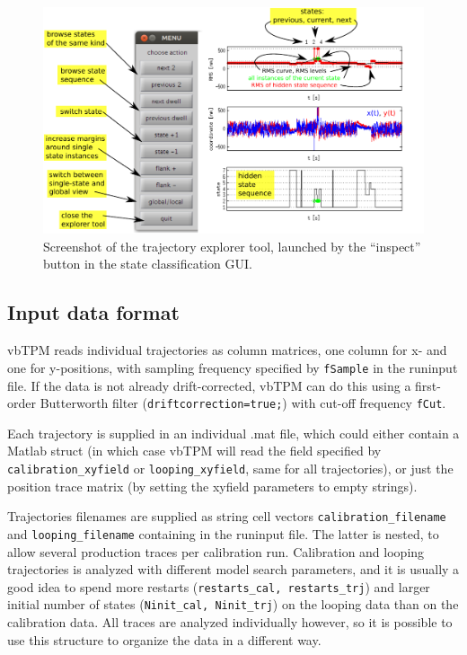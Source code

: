 \begin{figure}
  \begin{center}
    \includegraphics{figures/trajectory_explorer.pdf}    
  \end{center}
  \caption{Screenshot of the trajectory explorer tool, launched by the
    ``inspect'' button in the state classification
    GUI.}\label{fig:trjexplore}
\end{figure}

\subsection{Input data format}
vbTPM reads individual trajectories as column matrices, one column for
x- and one for y-positions, with sampling frequency specified by
\texttt{fSample} in the runinput file. If the data is not already
drift-corrected, vbTPM can do this using a first-order Butterworth
filter (\texttt{driftcorrection=true;}) with cut-off frequency
\texttt{fCut}.

Each trajectory is supplied in an individual .mat file, which could
either contain a Matlab struct (in which case vbTPM will read the
field specified by \texttt{calibration\_xyfield} or
\texttt{looping\_xyfield}, same for all trajectories), or just the
position trace matrix (by setting the xyfield parameters to empty
strings).

Trajectories filenames are supplied as string cell vectors
\texttt{calibration\_filename} and \texttt{looping\_filename}
containing in the runinput file. The latter is nested, to allow
several production traces per calibration run. Calibration and looping
trajectories is analyzed with different model search parameters, and
it is usually a good idea to spend more restarts
(\texttt{restarts\_cal, restarts\_trj}) and larger initial number of
states (\texttt{Ninit\_cal, Ninit\_trj}) on the looping data than on
the calibration data. All traces are analyzed individually however, so
it is possible to use this structure to organize the data in a
different way.

